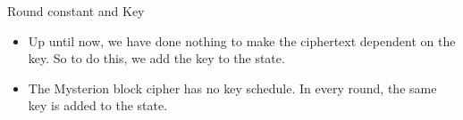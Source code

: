 \begin{frame}{Round constant and Key}
    \begin{itemize}
        \item Up until now, we have done nothing to make the ciphertext dependent on the key. So to do this, we add the key to the state. 
        \item The Mysterion block cipher has no key schedule. In every round, the same key is added to the state.
    \end{itemize}
\end{frame}